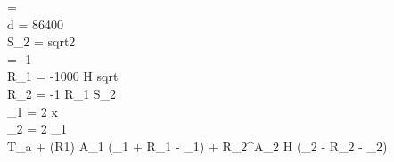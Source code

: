 \omega  =  \\
d   = 86400  \\
S_2 = sqrt{2} \\
\beta  = -1  \\

R_1 = -1000 \cdot H \cdot sqrt{\pi \cdot {}}  \\
R_2 = -1 \cdot R_1 \cdot S_2  \\

\gamma_1 = 2 \cdot \pi \cdot \omega \cdot x  \\
\gamma_2 = 2 \cdot \gamma_1  \\

T_a + \beta \cdot \exp(R1) \cdot A_1 \cdot \cos(\gamma_1 + R_1 - \phi_1) + \beta \cdot R_2^{A_2 \cdot H} \cdot \cos(\gamma_2 - R_2 - \phi_2)
